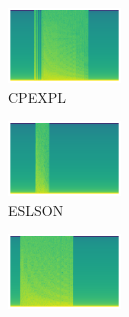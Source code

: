 \begin{figure}[H]
{
    \begin{subfigure}{0.23\textwidth}
      \includegraphics[width=3cm]{tempest_sounds/buttons/CPEXPL.raw-button.png}%
      \caption*{CPEXPL}
    \end{subfigure}
    \begin{subfigure}{0.23\textwidth}
      \includegraphics[width=3cm]{tempest_sounds/buttons/ESLSON.raw-button.png}%
      \caption*{ESLSON}
    \end{subfigure}
    \begin{subfigure}{0.23\textwidth}
      \includegraphics[width=3cm]{tempest_sounds/buttons/EXSNON.raw-button.png}%
\end{subfigure}}
\end{figure}
